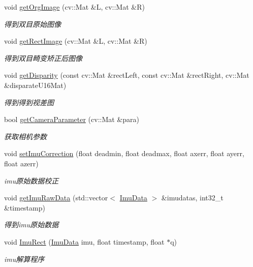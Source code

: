 \begin{DoxyCompactItemize}
\item 
void \hyperlink{classBinoCamera_a7e675afbd9b11a855b8816abe413f51b}{get\+Org\+Image} (cv\+::\+Mat \&L, cv\+::\+Mat \&R)
\begin{DoxyCompactList}\small\item\em 得到双目原始图像 \end{DoxyCompactList}\item 
void \hyperlink{classBinoCamera_a0ca8fdc7baebb847cec029094a1308d8}{get\+Rect\+Image} (cv\+::\+Mat \&L, cv\+::\+Mat \&R)
\begin{DoxyCompactList}\small\item\em 得到双目畸变矫正后图像 \end{DoxyCompactList}\item 
void \hyperlink{classBinoCamera_ac9e29c484ef2a61ce42e8c3dfa41b714}{get\+Disparity} (const cv\+::\+Mat \&rect\+Left, const cv\+::\+Mat \&rect\+Right, cv\+::\+Mat \&disparate\+U16\+Mat)
\begin{DoxyCompactList}\small\item\em 得到得到视差图 \end{DoxyCompactList}\item 
bool \hyperlink{classBinoCamera_a7dc100e891a67b59295e79b93241e16f}{get\+Camera\+Parameter} (cv\+::\+Mat \&para)
\begin{DoxyCompactList}\small\item\em 获取相机参数 \end{DoxyCompactList}\item 
void \hyperlink{classBinoCamera_a6bf7b4beec317a6e7bc8a66f3f255fd7}{set\+Imu\+Correction} (float deadmin, float deadmax, float axerr, float ayerr, float azerr)
\begin{DoxyCompactList}\small\item\em imu原始数据校正 \end{DoxyCompactList}\item 
void \hyperlink{classBinoCamera_a1e556254521060a48ddd6678bc9a3380}{get\+Imu\+Raw\+Data} (std\+::vector$<$ \hyperlink{structImuData}{Imu\+Data} $>$ \&imudatas, int32\+\_\+t \&timestamp)
\begin{DoxyCompactList}\small\item\em 得到imu原始数据 \end{DoxyCompactList}\item 
void \hyperlink{classBinoCamera_a5662fa1d861687af9577508be18ae29d}{Imu\+Rect} (\hyperlink{structImuData}{Imu\+Data} imu, float timestamp, float $\ast$q)
\begin{DoxyCompactList}\small\item\em imu解算程序 \end{DoxyCompactList}\end{DoxyCompactItemize}


